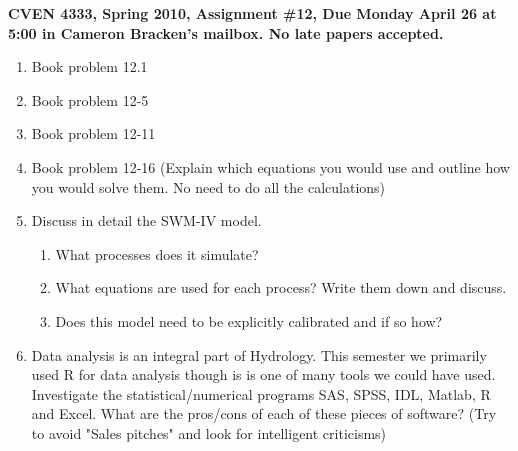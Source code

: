 \documentclass[11pt]{article}
\begin{document}
\textbf{CVEN 4333, Spring 2010, Assignment \#12, Due Monday April 26 at 5:00 in Cameron Bracken's mailbox. No late papers accepted.}

\begin{enumerate}

\item Book problem 12.1
\item Book problem 12-5
\item Book problem 12-11
\item Book problem 12-16 (Explain which equations you would use and outline how you would solve them. No need to do all the calculations)
\item Discuss in detail the SWM-IV model.
\begin{enumerate}
\item What processes does it simulate?
\item What equations are used for each process? Write them down and discuss.
\item Does this model need to be explicitly calibrated and if so how?
\end{enumerate}

\item Data analysis is an integral part of Hydrology. This semester we
primarily used R for data analysis though is is one of many tools we
could have used.   Investigate the statistical/numerical programs SAS,
SPSS, IDL, Matlab, R and Excel.  What are the pros/cons of each of
these pieces of software?  (Try to avoid "Sales pitches" and look for
intelligent criticisms)

\end{enumerate}
\end{document}
